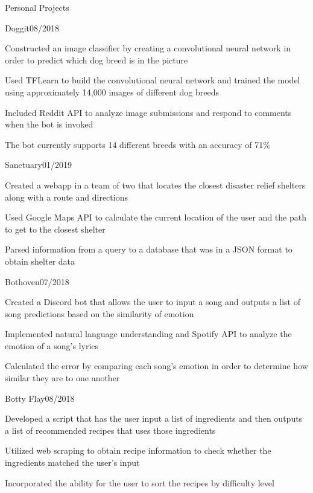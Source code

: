 \documentclass{resume}
\begin{document}
\begin{rSection}{Personal Projects}

\begin{rSubsection}{Doggit}{08/2018}{}{}
\item Constructed an image classifier by creating a convolutional neural network in order to predict which dog breed is in the picture
\item Used TFLearn to build the convolutional neural network and trained the model using approximately 14,000 images of different dog breeds
\item Included Reddit API to analyze image submissions and respond to comments when the bot is invoked
\item The bot currently supports 14 different breeds with an accuracy of 71\%
\end{rSubsection}

\begin{rSubsection}{Sanctuary}{01/2019}{}{}
\item Created a webapp in a team of two that locates the closest disaster relief shelters along with a route and directions
\item Used Google Maps API to calculate the current location of the user and the path to get to the closest shelter
\item Parsed information from a query to a database that was in a JSON format to obtain shelter data
\end{rSubsection}

\begin{rSubsection}{Bothoven}{07/2018}{}{}
\item Created a Discord bot that allows the user to input a song and outputs a list of song predictions based on the similarity of emotion
\item Implemented natural language understanding and Spotify API to analyze the emotion of a song's lyrics
\item Calculated the error by comparing each song's emotion in order to determine how similar they are to one another
\end{rSubsection}

\begin{rSubsection}{Botty Flay}{08/2018}{}{}
\item Developed a script that has the user input a list of ingredients and then outputs a list of recommended recipes that uses those ingredients
\item Utilized web scraping to obtain recipe information to check whether the ingredients matched the user's input
\item Incorporated the ability for the user to sort the recipes by difficulty level
\end{rSubsection}

\end{rSection}
\end{document}
